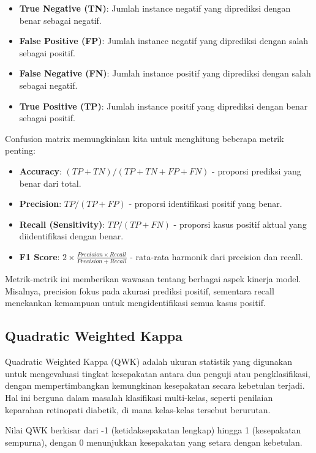\begin{itemize}
    \item \textbf{True Negative (TN)}: Jumlah instance negatif yang diprediksi dengan benar sebagai negatif.
    \item \textbf{False Positive (FP)}: Jumlah instance negatif yang diprediksi dengan salah sebagai positif.
    \item \textbf{False Negative (FN)}: Jumlah instance positif yang diprediksi dengan salah sebagai negatif.
    \item \textbf{True Positive (TP)}: Jumlah instance positif yang diprediksi dengan benar sebagai positif.
\end{itemize}

Confusion matrix memungkinkan kita untuk menghitung beberapa metrik penting:

\begin{itemize}
    \item \textbf{Accuracy}: $(TP + TN) / (TP + TN + FP + FN)$ - proporsi prediksi yang benar dari total.
    \item \textbf{Precision}: $TP / (TP + FP)$ - proporsi identifikasi positif yang benar.
    \item \textbf{Recall (Sensitivity)}: $TP / (TP + FN)$ - proporsi kasus positif aktual yang diidentifikasi dengan benar.
    \item \textbf{F1 Score}: $2 \times \frac{Precision \times Recall}{Precision + Recall}$ - rata-rata harmonik dari precision dan recall.
\end{itemize}

Metrik-metrik ini memberikan wawasan tentang berbagai aspek kinerja model. Misalnya, precision fokus pada akurasi prediksi positif, sementara recall menekankan kemampuan untuk mengidentifikasi semua kasus positif.

\subsection{Quadratic Weighted Kappa}

Quadratic Weighted Kappa (QWK) adalah ukuran statistik yang digunakan untuk mengevaluasi tingkat kesepakatan antara dua penguji atau pengklasifikasi, dengan mempertimbangkan kemungkinan kesepakatan secara kebetulan terjadi. Hal ini berguna dalam masalah klasifikasi multi-kelas, seperti penilaian keparahan retinopati diabetik, di mana kelas-kelas tersebut berurutan.

Nilai QWK berkisar dari -1 (ketidaksepakatan lengkap) hingga 1 (kesepakatan sempurna), dengan 0 menunjukkan kesepakatan yang setara dengan kebetulan.

